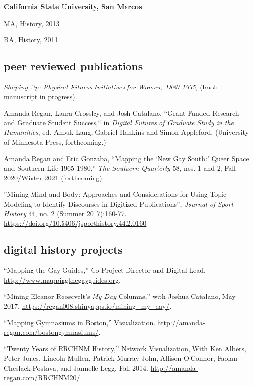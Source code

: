 \documentclass[11pt]{article}
\begin{document}
\vspace{0.05in}

\textbf{California State University, San Marcos}

\hfill\begin{minipage}{6.25in}
MA, History, 2013

\vspace{0.10in}
BA, History, 2011


\end{minipage}


\subsection{peer reviewed publications}\label{peer-reviewed}

\emph{Shaping Up: Physical Fitness Initiatives for Women, 1880-1965}, (book manuscript in progress).

Amanda Regan, Laura Crossley, and Josh Catalano, ``Grant Funded Research and Graduate Student Success,`` in \emph{Digital Futures of Graduate Study in the Humanities}, ed. Anouk Lang, Gabriel Hankins and Simon Appleford. (University of Minnesota Press, forthcoming.)

Amanda Regan and Eric Gonzaba, ``Mapping the `New Gay South:' Queer Space and Southern Life 1965-1980,'' \emph{The Southern Quarterly} 58, nos. 1 and 2, Fall 2020/Winter 2021 (forthcoming).

''Mining Mind and Body: Approaches and Considerations for Using Topic Modeling to Identify Discourses in Digitized Publications'', \emph{Journal of Sport History} 44, no. 2 (Summer 2017):160-77. \url{https://doi.org/10.5406/jsporthistory.44.2.0160}

\subsection{digital history projects}
``Mapping the Gay Guides,'' Co-Project Director and Digital Lead. \url{http://www.mappingthegayguides.org}.

``Mining Eleanor Roosevelt's \emph{My Day} Columns,'' with Joshua Catalano, May 2017. \url{https://regan008.shinyapps.io/mining_my_day/}.

``Mapping Gymnasiums in Boston,'' Visualization. \url{http://amanda-regan.com/bostongymnasiums/}.

``Twenty Years of RRCHNM History,'' Network Visualization, With Ken Albers, Peter Jones, Lincoln Mullen, Patrick Murray-John, Allison O’Connor, Faolan Cheslack-Postava, and Jannelle Legg, Fall 2014. \url{http://amanda-regan.com/RRCHNM20/}.
\end{document}
